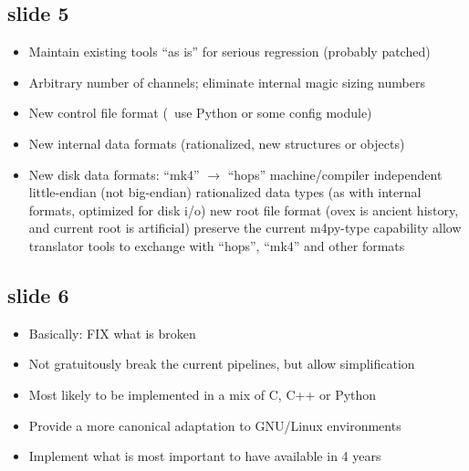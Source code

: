 \subsection{slide 5}
\begin{itemize}
\item Maintain existing tools “as is” for serious regression (probably patched)
\item Arbitrary number of channels; eliminate internal magic sizing numbers
\item New control file format (\eg~use \acs{Python} or some config module)
\item New internal data formats (rationalized, new structures or objects)
\item New disk data formats: “mk4” $\rightarrow$ “hops”
\sbitem machine/compiler independent little-endian (not big-endian)
\sbitem rationalized data types (as with internal formats,
optimized for disk \ac{i/o})
\sbitem new root file format (\ac{ovex}
is ancient history, and current root is artificial)
\sbitem preserve the current \ac{m4py}-type capability
\sbitem allow translator tools to exchange with “hops”, “mk4” and other formats
\end{itemize}

\subsection{slide 6}
\begin{itemize}
\item Basically: FIX what is broken
\item Not gratuitously break the current pipelines, but allow simplification
\item Most likely to be implemented in a mix of \ac{C}, \ac{C++} or
\acs{Python}
\item Provide a more canonical adaptation to \ac{GNU/Linux} environments
\item Implement what is most important to have available in 4 years
\end{itemize}
%
%
